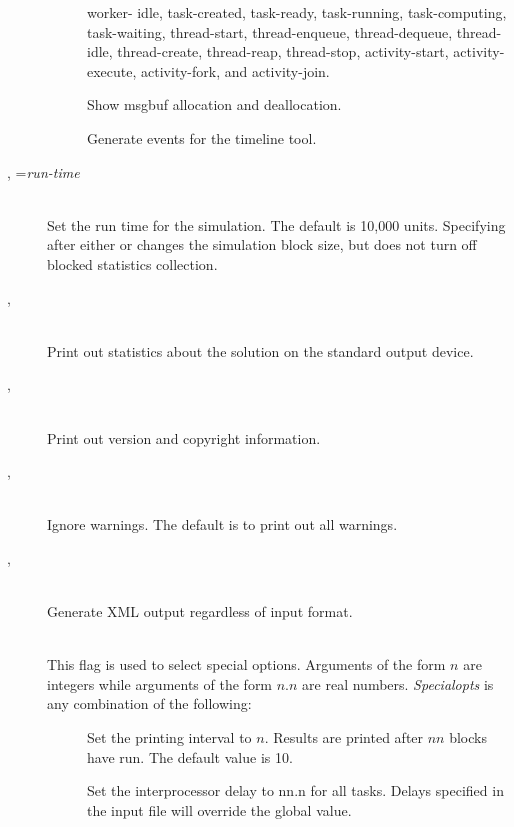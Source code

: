 \begin{description}
\begin{description}
    worker- idle, task-created, task-ready, task-running,
    task-computing, task-waiting, thread-start, thread-enqueue,
    thread-dequeue, thread-idle, thread-create, thread-reap,
    thread-stop, activity-start, activity-execute, activity-fork, and
    activity-join.
  \item[\optarg{msgbuf}{}] Show msgbuf allocation and deallocation.
  \item[\optarg{timeline}{}] Generate events for the timeline tool.
  \end{description}
\item[\flag{T}{}, \longopt{run-time}=\emph{run-time}]~\\
  Set the run time for the simulation.  The
  default is 10,000 units.  Specifying  after either
   or  changes the simulation block size, but does
  not turn off blocked statistics
  collection.
\item[\flag{v}{}, \longopt{verbose}]~\\
  Print out statistics
  about the solution on the standard output device.
\item[\flag{V}{}, \longopt{version}]~\\
  Print out version and copyright
  information.
\item[\flag{w}{}, \longopt{no-warnings}]~\\
Ignore warnings.  The default is to print out all warnings.
\item[\flag{x}{}, \longopt{xml}]~\\
Generate XML output regardless of input format.
\item[\flag{z}{specialopts}]~\\
  This flag is used to select special options.  Arguments of the form
  $n$ are integers while arguments of the form $n.n$ are real
  numbers.  \emph{Specialopts} is any combination of the following:
  \begin{description}
  \item[] Set the printing interval to
    $n$.  Results are printed after $nn$ blocks have run.  The default
    value is 10.
  \item[] Set the interprocessor
    delay to nn.n for all tasks.  Delays
    specified in the input file will override the global value.

\end{description}
\end{description}
